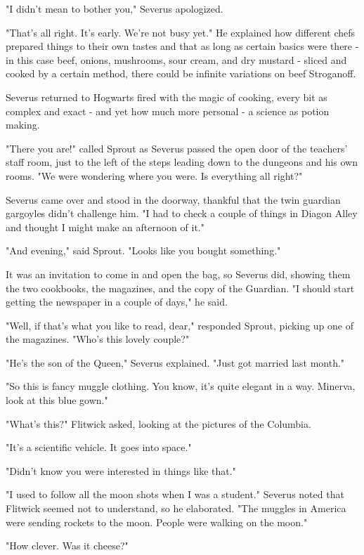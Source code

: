 "I didn't mean to bother you," Severus apologized.

"That's all right. It's early. We're not busy yet." He explained how different chefs prepared things to their own tastes and that as long as certain basics were there - in this case beef, onions, mushrooms, sour cream, and dry mustard - sliced and cooked by a certain method, there could be infinite variations on beef Stroganoff.

Severus returned to Hogwarts fired with the magic of cooking, every bit as complex and exact - and yet how much more personal - a science as potion making.

"There you are!" called Sprout as Severus passed the open door of the teachers' staff room, just to the left of the steps leading down to the dungeons and his own rooms. "We were wondering where you were. Is everything all right?"

Severus came over and stood in the doorway, thankful that the twin guardian gargoyles didn't challenge him. "I had to check a couple of things in Diagon Alley and thought I might make an afternoon of it."

"And evening," said Sprout. "Looks like you bought something."

It was an invitation to come in and open the bag, so Severus did, showing them the two cookbooks, the magazines, and the copy of the Guardian. "I should start getting the newspaper in a couple of days," he said.

"Well, if that's what you like to read, dear," responded Sprout, picking up one of the magazines. "Who's this lovely couple?"

"He's the son of the Queen," Severus explained. "Just got married last month."

"So this is fancy muggle clothing. You know, it's quite elegant in a way. Minerva, look at this blue gown."

"What's this?" Flitwick asked, looking at the pictures of the Columbia.

"It's a scientific vehicle. It goes into space."

"Didn't know you were interested in things like that."

"I used to follow all the moon shots when I was a student." Severus noted that Flitwick seemed not to understand, so he elaborated. "The muggles in America were sending rockets to the moon. People were walking on the moon."

"How clever. Was it cheese?"

